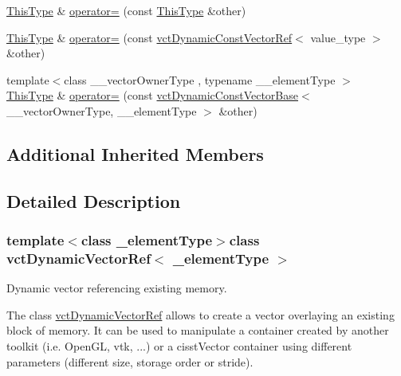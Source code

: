 {\bf }\par
\begin{DoxyCompactItemize}
\item 
\hyperlink{classvct_dynamic_vector_ref_adde8a247e72c476120c26cfa15a37c6d}{This\+Type} \& \hyperlink{classvct_dynamic_vector_ref_a10c6fd35bc208ca4455acf12fb4756bc}{operator=} (const \hyperlink{classvct_dynamic_vector_ref_adde8a247e72c476120c26cfa15a37c6d}{This\+Type} \&other)
\item 
\hyperlink{classvct_dynamic_vector_ref_adde8a247e72c476120c26cfa15a37c6d}{This\+Type} \& \hyperlink{classvct_dynamic_vector_ref_a872f9fd05b36fe0c1a8e47ff32b77549}{operator=} (const \hyperlink{classvct_dynamic_const_vector_ref}{vct\+Dynamic\+Const\+Vector\+Ref}$<$ value\+\_\+type $>$ \&other)
\item 
{\footnotesize template$<$class \+\_\+\+\_\+vector\+Owner\+Type , typename \+\_\+\+\_\+element\+Type $>$ }\\\hyperlink{classvct_dynamic_vector_ref_adde8a247e72c476120c26cfa15a37c6d}{This\+Type} \& \hyperlink{classvct_dynamic_vector_ref_aa5c2a82b9270f763f5ab49ef8b51d113}{operator=} (const \hyperlink{classvct_dynamic_const_vector_base}{vct\+Dynamic\+Const\+Vector\+Base}$<$ \+\_\+\+\_\+vector\+Owner\+Type, \+\_\+\+\_\+element\+Type $>$ \&other)
\end{DoxyCompactItemize}

\subsection*{Additional Inherited Members}


\subsection{Detailed Description}
\subsubsection*{template$<$class \+\_\+element\+Type$>$class vct\+Dynamic\+Vector\+Ref$<$ \+\_\+element\+Type $>$}

Dynamic vector referencing existing memory. 

The class \hyperlink{classvct_dynamic_vector_ref}{vct\+Dynamic\+Vector\+Ref} allows to create a vector overlaying an existing block of memory. It can be used to manipulate a container created by another toolkit (i.\+e. Open\+G\+L, vtk, ...) or a cisst\+Vector container using different parameters (different size, storage order or stride).

